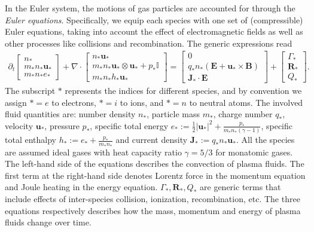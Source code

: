 \documentclass{report}
\begin{document}
In the Euler system, the motions of gas particles are accounted for through the \emph{Euler equations}. Specifically, we equip each species with one set of (compressible) Euler equations, taking into account the effect of electromagnetic fields as well as other processes like collisions and recombination. The generic expressions read
\begin{align} \label{equ:euler_}
    \partial_t
    \begin{bmatrix}
    n_* \\
    m_*n_* \mathbf{u}_* \\
    m_*n_* e_*
    \end{bmatrix}
    + \nabla \cdot
    \begin{bmatrix}
    n_* \mathbf{u}_* \\
    m_*n_* \mathbf{u}_* \otimes \mathbf{u}_* + p_*\mathbb{I} \\
    m_*n_* h_* \mathbf{u}_*
    \end{bmatrix}
    =
    \begin{bmatrix}
    0 \\
    q_*n_*(\mathbf{E} + \mathbf{u}_* \times \mathbf{B}) \\
    \mathbf{J}_* \cdot \mathbf{E}
    \end{bmatrix}
    +
    \begin{bmatrix}
    \Gamma_* \\
    \mathbf{R}_* \\
    Q_*
    \end{bmatrix}.
\end{align}
The subscript $*$ represents the indices for different species, and by convention we assign $* = e$ to electrons, $* = i$ to ions, and $* = n$ to neutral atoms. The involved fluid quantities are: number density $n_*$, particle mass $m_*$,  charge number $q_*$, velocity $\mathbf{u}_*$, pressure $p_*$, specific total energy $e_* := \frac{1}{2}|\mathbf{u}_*|^2 + \frac{p_*}{m_*n_*(\gamma - 1)}$, specific total enthalpy $h_* := e_* + \frac{p_*}{m_*n_*}$ and current density $\mathbf{J}_* := q_*n_*\mathbf{u}_*$. All the species are assumed ideal gases with heat capacity ratio $\gamma=5/3$ for monatomic gases. The left-hand side of the equations describes the convection of plasma fluids. The first term at the right-hand side denotes Lorentz force in the momentum equation and Joule heating in the energy equation. $\Gamma_*, \mathbf{R}_*, Q_*$ are generic terms that include effects of inter-species collision, ionization, recombination, etc. The three equations respectively describes how the mass, momentum and energy of plasma fluids change over time. 
\end{document}
